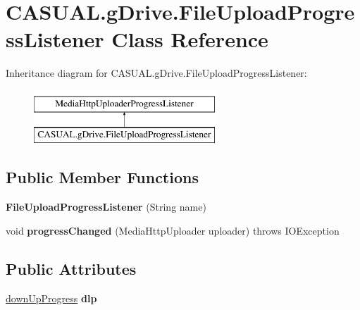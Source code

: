\hypertarget{classCASUAL_1_1gDrive_1_1FileUploadProgressListener}{\section{C\-A\-S\-U\-A\-L.\-g\-Drive.\-File\-Upload\-Progress\-Listener Class Reference}
\label{classCASUAL_1_1gDrive_1_1FileUploadProgressListener}
}
Inheritance diagram for C\-A\-S\-U\-A\-L.\-g\-Drive.\-File\-Upload\-Progress\-Listener\-:\begin{figure}[H]
\begin{center}
\leavevmode
\includegraphics[height=2.000000cm]{classCASUAL_1_1gDrive_1_1FileUploadProgressListener}
\end{center}
\end{figure}
\subsection*{Public Member Functions}
\begin{DoxyCompactItemize}
\item 
\hypertarget{classCASUAL_1_1gDrive_1_1FileUploadProgressListener_a1e60179b7ff0f44a110e1ce7a40dc326}{{\bfseries File\-Upload\-Progress\-Listener} (String name)}\label{classCASUAL_1_1gDrive_1_1FileUploadProgressListener_a1e60179b7ff0f44a110e1ce7a40dc326}

\item 
\hypertarget{classCASUAL_1_1gDrive_1_1FileUploadProgressListener_a107c51afda6bb20d4c5d37710f0c32c3}{void {\bfseries progress\-Changed} (Media\-Http\-Uploader uploader)  throws I\-O\-Exception }\label{classCASUAL_1_1gDrive_1_1FileUploadProgressListener_a107c51afda6bb20d4c5d37710f0c32c3}

\end{DoxyCompactItemize}
\subsection*{Public Attributes}
\begin{DoxyCompactItemize}
\item 
\hypertarget{classCASUAL_1_1gDrive_1_1FileUploadProgressListener_a33f4df4c07281c06bef5d21fc57ccdaa}{\hyperlink{classCASUAL_1_1gDrive_1_1downUpProgress}{down\-Up\-Progress} {\bfseries dlp}}\label{classCASUAL_1_1gDrive_1_1FileUploadProgressListener_a33f4df4c07281c06bef5d21fc57ccdaa}

\end{DoxyCompactItemize}


